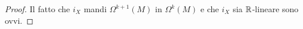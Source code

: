 \begin{proof}
	Il fatto che $i_X$ mandi $\Omega^{k+1}(M)$ in $\Omega^k(M)$ e che $i_X$ sia $\mathbb R$-lineare sono ovvi.
	
	
	
	
	

\end{proof}

